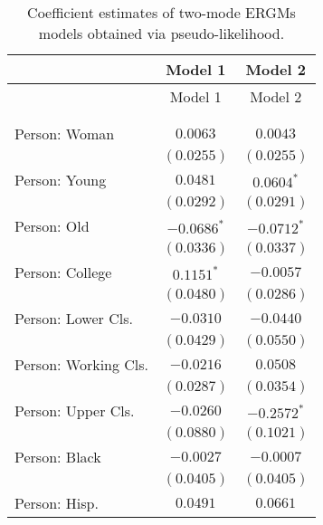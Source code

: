 
\begin{center}
\begin{longtable}{l c c}
\toprule
 & Model 1 & Model 2 \\
\midrule
\endfirsthead
\toprule
 & Model 1 & Model 2 \\
\midrule
\endhead
\bottomrule
\endfoot
\bottomrule
\multicolumn{3}{l}{\scriptsize{$^{***}p<0.001$; $^{**}p<0.01$; $^{*}p<0.05$}}\\
\caption{Coefficient estimates of two-mode ERGMs models obtained via pseudo-likelihood.}
\label{tab:reg3}
\endlastfoot \\
Person: Woman                             & $0.0063$        & $0.0043$       \\
                                          & $(0.0255)$      & $(0.0255)$     \\
Person: Young                             & $0.0481$        & $0.0604^{*}$   \\
                                          & $(0.0292)$      & $(0.0291)$     \\
Person: Old                               & $-0.0686^{*}$   & $-0.0712^{*}$  \\
                                          & $(0.0336)$      & $(0.0337)$     \\
Person: College                           & $0.1151^{*}$    & $-0.0057$      \\
                                          & $(0.0480)$      & $(0.0286)$     \\
Person: Lower Cls.                        & $-0.0310$       & $-0.0440$      \\
                                          & $(0.0429)$      & $(0.0550)$     \\
Person: Working Cls.                      & $-0.0216$       & $0.0508$       \\
                                          & $(0.0287)$      & $(0.0354)$     \\
Person: Upper Cls.                        & $-0.0260$       & $-0.2572^{*}$  \\
                                          & $(0.0880)$      & $(0.1021)$     \\
Person: Black                             & $-0.0027$       & $-0.0007$      \\
                                          & $(0.0405)$      & $(0.0405)$     \\
Person: Hisp.                             & $0.0491$        & $0.0661$       \\

\end{longtable}
\end{center}
